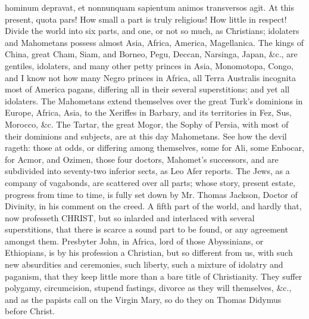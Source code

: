 {hominum depravat, et nonnunquam sapientum animos transversos agit. At
this present, quota pars! How small a part is truly religious! How
little in respect! Divide the world into six parts, and one, or not so
much, as Christians; idolaters and Mahometans possess almost Asia,
Africa, America, Magellanica. The kings of China, great Cham, Siam, and
Borneo, Pegu, Deccan, Narsinga, Japan, \&c., are gentiles, idolaters,
and many other petty princes in Asia, Monomotopa, Congo, and I know not
how many Negro princes in Africa, all Terra Australis incognita most of
America pagans, differing all in their several superstitions; and yet
all idolaters. The Mahometans extend themselves over the great Turk's
dominions in Europe, Africa, Asia, to the Xeriffes in Barbary, and its
territories in Fez, Sus, Morocco, \&c. The Tartar, the great Mogor, the
Sophy of Persia, with most of their dominions and subjects, are at this
day Mahometans. See how the devil rageth: those at odds, or differing
among themselves, some for Ali, some Enbocar, for Acmor, and
Ozimen, those four doctors, Mahomet's successors, and are subdivided
into seventy-two inferior sects, as Leo Afer reports. The Jews,
as a company of vagabonds, are scattered over all parts; whose story,
present estate, progress from time to time, is fully set down by
Mr. Thomas Jackson, Doctor of Divinity, in his comment on the
creed. A fifth part of the world, and hardly that, now professeth
\textsc{CHRIST}, but so inlarded and interlaced with several superstitions, that
there is scarce a sound part to be found, or any agreement amongst
them. Presbyter John, in Africa, lord of those Abyssinians, or
Ethiopians, is by his profession a Christian, but so different from us,
with such new absurdities and ceremonies, such liberty, such a mixture
of idolatry and paganism, that they keep little more than a bare
title of Christianity. They suffer polygamy, circumcision, stupend
fastings, divorce as they will themselves, \&c., and as the papists call
on the Virgin Mary, so do they on Thomas Didymus before Christ.

}
